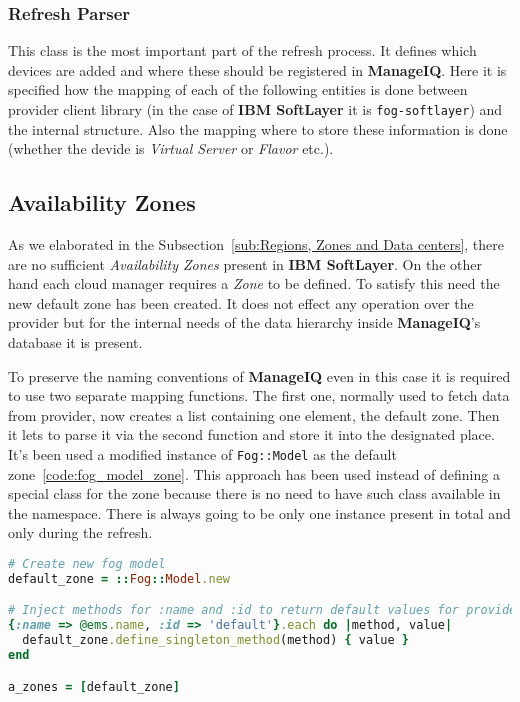 \subsubsection{Refresh Parser}
\label{subs:Refresh Parser}

This class is the most important part of the refresh process. It defines which devices are added and where these should be registered in \textbf{ManageIQ}. Here it is specified how the mapping of each of the following entities is done between provider client library (in the case of \textbf{IBM SoftLayer} it is \texttt{fog-softlayer}) and the internal structure. Also the mapping where to store these information is done (whether the devide is \emph{Virtual Server} or \emph{Flavor} etc.).

\subsection{Availability Zones}
\label{sub:Availability Zones}

As we elaborated in the Subsection~\ref{sub:Regions, Zones and Data centers}, there are no sufficient \emph{Availability Zones} present in \textbf{IBM SoftLayer}. On the other hand each cloud manager requires a \emph{Zone} to be defined. To satisfy this need the new default zone has been created. It does not effect any operation over the provider but for the internal needs of the data hierarchy inside \textbf{ManageIQ}'s database it is present.

To preserve the naming conventions of \textbf{ManageIQ} even in this case it is required to use two separate mapping functions. The first one, normally used to fetch data from provider, now creates a list containing one element, the default zone. Then it lets to parse it via the second function and store it into the designated place. It's been used a modified instance of \verb|Fog::Model| as the default zone~\ref{code:fog_model_zone}. This approach has been used instead of defining a special class for the zone because there is no need to have such class available in the namespace. There is always going to be only one instance present in total and only during the refresh.

\begin{lstlisting}[language=Ruby,caption={Declaration of the default \emph{Availability Zone}},label=code:fog_model_zone,float=htpb]
# Create new fog model
default_zone = ::Fog::Model.new

# Inject methods for :name and :id to return default values for provider
{:name => @ems.name, :id => 'default'}.each do |method, value|
  default_zone.define_singleton_method(method) { value }
end

a_zones = [default_zone]
\end{lstlisting}

